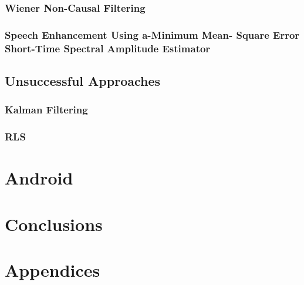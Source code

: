 \documentclass[11pt,a4paper,spanish]{book}  %
\theoremstyle{definition}  %
\theoremstyle{plain}  %
\theoremstyle{remark}  %
\begin{document}
	\subsection{Wiener Non-Causal Filtering}
	
	\subsection{Speech Enhancement Using a-Minimum Mean- Square Error Short-Time Spectral Amplitude Estimator}


\section{Unsuccessful Approaches}

	\subsection{Kalman Filtering}
	
	
	\subsection{RLS}

\chapter{Android}

\chapter{Conclusions}

\chapter{Appendices}
\label{sec:appendix}



\end{document}
